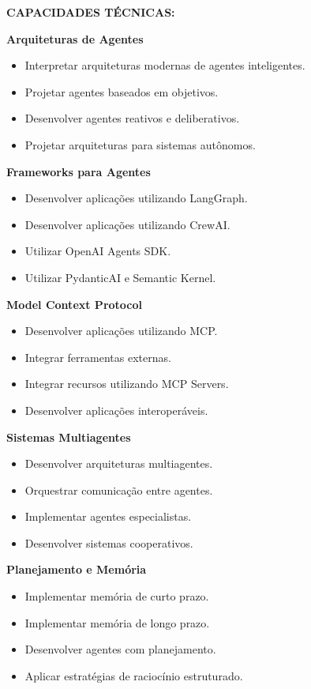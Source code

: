\textbf{CAPACIDADES TÉCNICAS:}

\textbf{Arquiteturas de Agentes}

\begin{itemize}
\item Interpretar arquiteturas modernas de agentes inteligentes.
\item Projetar agentes baseados em objetivos.
\item Desenvolver agentes reativos e deliberativos.
\item Projetar arquiteturas para sistemas autônomos.
\end{itemize}

\textbf{Frameworks para Agentes}

\begin{itemize}
\item Desenvolver aplicações utilizando LangGraph.
\item Desenvolver aplicações utilizando CrewAI.
\item Utilizar OpenAI Agents SDK.
\item Utilizar PydanticAI e Semantic Kernel.
\end{itemize}

\textbf{Model Context Protocol}

\begin{itemize}
\item Desenvolver aplicações utilizando MCP.
\item Integrar ferramentas externas.
\item Integrar recursos utilizando MCP Servers.
\item Desenvolver aplicações interoperáveis.
\end{itemize}

\textbf{Sistemas Multiagentes}

\begin{itemize}
\item Desenvolver arquiteturas multiagentes.
\item Orquestrar comunicação entre agentes.
\item Implementar agentes especialistas.
\item Desenvolver sistemas cooperativos.
\end{itemize}

\textbf{Planejamento e Memória}

\begin{itemize}
\item Implementar memória de curto prazo.
\item Implementar memória de longo prazo.
\item Desenvolver agentes com planejamento.
\item Aplicar estratégias de raciocínio estruturado.
\end{itemize}

